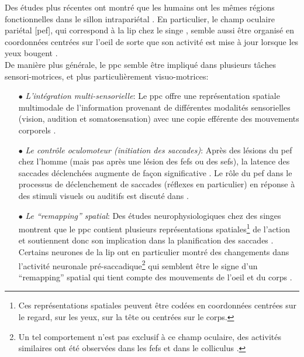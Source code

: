 Des études plus récentes ont montré que les humains ont les mêmes régions fonctionnelles dans le sillon intrapariétal \cite{Culham:2006}. En particulier, le champ oculaire pariétal [\gls{pef}], qui correspond à la \gls{lip} chez le singe \cite{Perry:2000}, semble aussi être organisé en coordonnées centrées sur l'oeil de sorte que son activité est mise à jour lorsque les yeux bougent \cite{Medendorp:2003}.\\

De manière plus générale, le \gls{ppc} semble être impliqué dans plusieurs tâches sensori-motrices, et plus particulièrement visuo-motrices:\\
\begin{itemize}
\item[$\bullet$] \textit{L'intégration multi-sensorielle}:
Le \gls{ppc} offre une représentation spatiale multimodale de l'information provenant de différentes modalités sensorielles (vision, audition et somatosensation) avec une copie efférente des mouvements corporels \cite{Andersen:1997}.\\
\item[$\bullet$] \textit{Le contrôle oculomoteur (initiation des saccades)}:
Après des lésions du \gls{pef} chez l'homme (mais pas après une lésion des \glspl{fef} ou des \glspl{sef}), la latence des saccades déclenchées augmente de façon significative \cite{Pierrot:1991}. Le rôle du \gls{pef} dans le processus de déclenchement de saccades (réflexes en particulier) en réponse à des stimuli visuels ou auditifs est discuté dans \cite{Leigh:2004}.\\
\item[$\bullet$] \textit{Le ``remapping'' spatial}:
Des études neurophysiologiques chez des singes montrent que le \gls{ppc} contient plusieurs représentations spatiales\footnote{Ces représentations spatiales peuvent être codées en coordonnées centrées sur le regard, sur les yeux, sur la tête ou centrées sur le corps.} de l'action et soutiennent donc son implication dans la planification des saccades \cite{Colby:1996}. Certains neurones de la \gls{lip} ont en particulier montré des changements dans l'activité neuronale pré-saccadique\footnote{ Un tel comportement n'est pas exclusif à ce champ oculaire, des activités similaires ont été observées dans les \glspl{fef} \cite{Goldberg:1990,Bruce:1985} et dans le colliculus \cite{Mays:1980}.} qui semblent être le signe d'un ``remapping'' spatial qui tient compte des mouvements de l'oeil et du corps \cite{Ross:2001,Duhamel:1992}.\\

\end{itemize}
